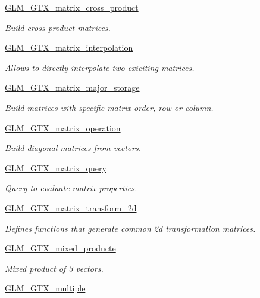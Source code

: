\begin{DoxyCompactItemize}
\hyperlink{group__gtx__matrix__cross__product}{G\-L\-M\-\_\-\-G\-T\-X\-\_\-matrix\-\_\-cross\-\_\-product}
\begin{DoxyCompactList}\small\item\em Build cross product matrices. \end{DoxyCompactList}\item 
\hyperlink{group__gtx__matrix__interpolation}{G\-L\-M\-\_\-\-G\-T\-X\-\_\-matrix\-\_\-interpolation}
\begin{DoxyCompactList}\small\item\em Allows to directly interpolate two exiciting matrices. \end{DoxyCompactList}\item 
\hyperlink{group__gtx__matrix__major__storage}{G\-L\-M\-\_\-\-G\-T\-X\-\_\-matrix\-\_\-major\-\_\-storage}
\begin{DoxyCompactList}\small\item\em Build matrices with specific matrix order, row or column. \end{DoxyCompactList}\item 
\hyperlink{group__gtx__matrix__operation}{G\-L\-M\-\_\-\-G\-T\-X\-\_\-matrix\-\_\-operation}
\begin{DoxyCompactList}\small\item\em Build diagonal matrices from vectors. \end{DoxyCompactList}\item 
\hyperlink{group__gtx__matrix__query}{G\-L\-M\-\_\-\-G\-T\-X\-\_\-matrix\-\_\-query}
\begin{DoxyCompactList}\small\item\em Query to evaluate matrix properties. \end{DoxyCompactList}\item 
\hyperlink{group__gtx__matrix__transform__2d}{G\-L\-M\-\_\-\-G\-T\-X\-\_\-matrix\-\_\-transform\-\_\-2d}
\begin{DoxyCompactList}\small\item\em Defines functions that generate common 2d transformation matrices. \end{DoxyCompactList}\item 
\hyperlink{group__gtx__mixed__product}{G\-L\-M\-\_\-\-G\-T\-X\-\_\-mixed\-\_\-producte}
\begin{DoxyCompactList}\small\item\em Mixed product of 3 vectors. \end{DoxyCompactList}\item 
\hyperlink{group__gtx__multiple}{G\-L\-M\-\_\-\-G\-T\-X\-\_\-multiple}

\end{DoxyCompactItemize}
